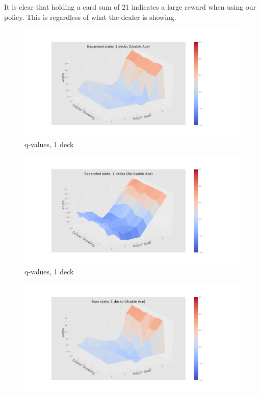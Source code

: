 It is clear that holding a card sum of 21 indicates a large reward when using our policy. This is regardless of what the dealer is showing.
\begin{center}
\begin{figure}[htp]
  	 \includegraphics[width=1.2\textwidth]{./figures/ace_3D_exp_1_decks.png}
   \caption{q-values, 1 deck\label{sfig:3Dnd1}}
\end{figure}
 \begin{figure}[htp]%
  	 \includegraphics[width=1.2\textwidth]{./figures/noace_3D_exp_1_decks.png}
   \caption{q-values, 1 deck\label{sfig:3Dnd2}}
 \end{figure}
 \begin{figure}[htp]%
  	 \includegraphics[width=1.2\textwidth]{./figures/ace_3D_sum_1_decks.png}

\end{figure}
\end{center}
